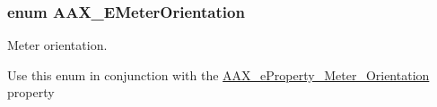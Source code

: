 \hypertarget{a00206_af260f0f9a6bff0f7bfd3200b2947c96b}{}
\subsubsection[{A\+A\+X\+\_\+\+E\+Meter\+Orientation}]{\setlength{\rightskip}{0pt plus 5cm}enum {\bf A\+A\+X\+\_\+\+E\+Meter\+Orientation}}\label{a00206_af260f0f9a6bff0f7bfd3200b2947c96b}


Meter orientation. 

Use this enum in conjunction with the \hyperlink{a00283_a6571f4e41a5dd06e4067249228e2249ea2dc61e2c931c4e28c625611a30d9485d}{A\+A\+X\+\_\+e\+Property\+\_\+\+Meter\+\_\+\+Orientation} property

